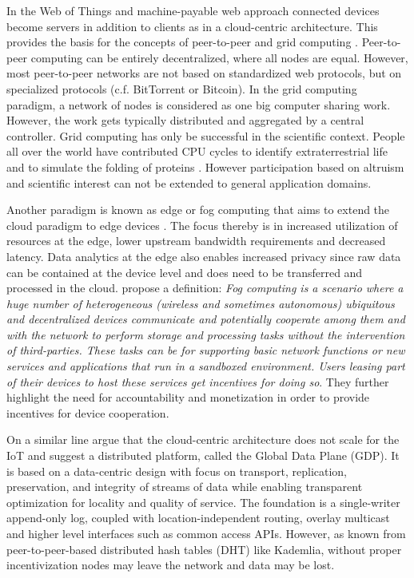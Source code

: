 In the Web of Things and machine-payable web approach connected devices become servers in addition to clients as in a cloud-centric architecture. This provides the basis for the concepts of peer-to-peer \parencite{Rodrigues:2010:PS:1831407.1831427} and grid computing \parencite{Anderson2004boinc}. Peer-to-peer computing can be entirely decentralized, where all nodes are equal. However, most peer-to-peer networks are not based on standardized web protocols, but on specialized protocols (c.f. BitTorrent or Bitcoin). In the grid computing paradigm, a network of nodes is considered as one big computer sharing work. However, the work gets typically distributed and aggregated by a central controller. Grid computing has only be successful in the scientific context. People all over the world have contributed CPU cycles to identify extraterrestrial life \parencite{Anderson:2002:SEP:581571.581573} and to simulate the folding of proteins \parencite{Beberg2009Folding}. However participation based on altruism and scientific interest can not be extended to general application domains.   

Another paradigm is known as edge or fog computing that aims to extend the cloud paradigm to edge devices \parencite{Bonomi:2012:FCR:2342509.2342513,ISI:000343986300007,Yi:2015:SFC:2757384.2757397}. The focus thereby is in increased utilization of resources at the edge, lower upstream bandwidth requirements and decreased latency. Data analytics at the edge also enables increased privacy since raw data can be contained at the device level and does need to be transferred and processed in the cloud. \cite{ISI:000343986300007} propose a definition: \emph{Fog computing is a scenario where a huge number of heterogeneous (wireless and sometimes autonomous) ubiquitous and decentralized devices communicate and potentially cooperate among them and with the network to perform storage and processing tasks without the intervention of third-parties. These tasks can be for supporting basic network functions or new services and applications that run in a sandboxed environment. Users leasing part of their devices to host these services get incentives for doing so}. They further highlight the need for accountability and monetization in order to provide incentives for device cooperation. 

On a similar line \cite{Zhang:2015} argue that the cloud-centric architecture does not scale for the IoT and suggest a distributed platform, called the Global Data Plane (GDP). It is based on a data-centric design with focus on transport, replication, preservation, and integrity of streams of data while enabling transparent optimization for locality and quality of service. The foundation is a single-writer append-only log, coupled with location-independent routing, overlay multicast and higher level interfaces such as common access APIs. However, as known from peer-to-peer-based distributed hash tables (DHT) like Kademlia, without proper incentivization nodes may leave the network and data may be lost. 

